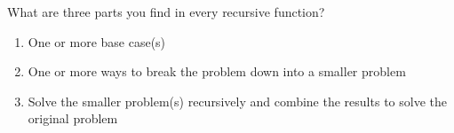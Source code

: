 \begin{blocksection}
\question What are three parts you find in every recursive function?

\begin{solution}[0.5in]
\begin{enumerate}
\item One or more base case(s)
\item One or more ways to break the problem down into a smaller problem
\item Solve the smaller problem(s) recursively and combine the results to solve the original problem
\end{enumerate}
\end{solution}
\end{blocksection}
